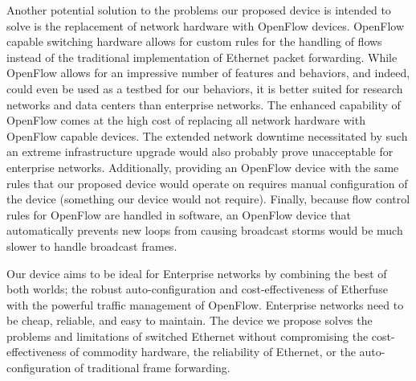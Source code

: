 \documentclass{article}
\begin{document}
	Another potential solution to the problems our proposed device is intended to solve is the replacement of network hardware with OpenFlow devices.
	OpenFlow capable switching hardware allows for custom rules for the handling of flows instead of the traditional implementation of Ethernet packet forwarding.
	While OpenFlow allows for an impressive number of features and behaviors, and indeed, could even be used as a testbed for our behaviors, it is better suited for research networks and data centers than enterprise networks.
  The enhanced capability of OpenFlow comes at the high cost of replacing all network hardware with OpenFlow capable devices.
  The extended network downtime necessitated by such an extreme infrastructure upgrade would also probably prove unacceptable for enterprise networks.
  Additionally, providing an OpenFlow device with the same rules that our proposed device would operate on requires manual configuration of the device (something our device would not require).
  Finally, because flow control rules for OpenFlow are handled in software, an OpenFlow device that automatically prevents new loops from causing broadcast storms would be much slower to handle broadcast frames.
	
  Our device aims to be ideal for Enterprise networks by combining the best of both worlds; the robust auto-configuration and cost-effectiveness of Etherfuse with the powerful traffic management of OpenFlow.
  Enterprise networks need to be cheap, reliable, and easy to maintain.
  The device we propose solves the problems and limitations of switched Ethernet without compromising the cost-effectiveness of commodity hardware, the reliability of Ethernet, or the auto-configuration of traditional frame forwarding.

\newpage


\end{document}

